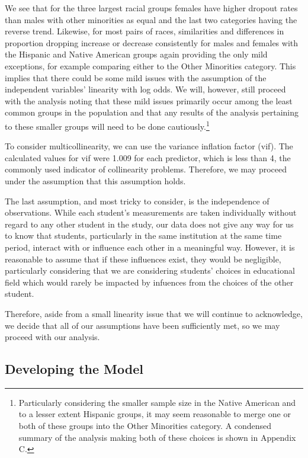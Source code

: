 \documentclass[]{article}
\begin{document}
We see that for the three largest racial groups females have higher
dropout rates than males with other minorities as equal and the last two
categories having the reverse trend. Likewise, for most pairs of races,
similarities and differences in proportion dropping increase or decrease
consistently for males and females with the Hispanic and Native American
groups again providing the only mild exceptions, for example comparing
either to the Other Minorities category. This implies that there could
be some mild issues with the assumption of the independent variables'
linearity with log odds. We will, however, still proceed with the
analysis noting that these mild issues primarily occur among the least
common groups in the population and that any results of the analysis
pertaining to these smaller groups will need to be done
cautiously.\footnote{Particularly considering the smaller sample size in the Native American and to a lesser extent Hispanic groups, it may seem reasonable to merge one or both of these groups into the Other Minorities category. A condensed summary of the analysis making both of these choices is shown in Appendix C.}

To consider multicollinearity, we can use the variance inflation factor
(vif). The calculated values for vif were 1.009 for each predictor,
which is less than 4, the commonly used indicator of collinearity
problems. Therefore, we may proceed under the assumption that this
assumption holds.

The last assumption, and most tricky to consider, is the independence of
observations. While each student's measurements are taken individually
without regard to any other student in the study, our data does not give
any way for us to know that students, particularly in the same
institution at the same time period, interact with or influence each
other in a meaningful way. However, it is reasonable to assume that if
these influences exist, they would be negligible, particularly
considering that we are considering students' choices in educational
field which would rarely be impacted by infuences from the choices of
the other student.

Therefore, aside from a small linearity issue that we will continue to
acknowledge, we decide that all of our assumptions have been
sufficiently met, so we may proceed with our analysis.

\subsection{Developing the Model}\label{developing-the-model}
\end{document}
